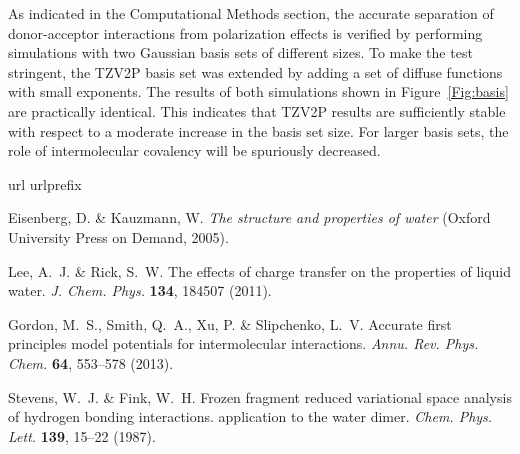 \documentclass[10pt,amsmath,twocolumn,aps,prl,superscriptaddress,floatfix]{revtex4-1}
\begin{document}
As indicated in the Computational Methods section, the accurate separation of donor-acceptor interactions from polarization effects is verified by performing simulations with two Gaussian basis sets of different sizes. 
To make the test stringent, the TZV2P basis set was extended by adding a set of diffuse functions with small exponents. 
The results of both simulations shown in Figure~\ref{Fig:basis} are practically identical. 
This indicates that TZV2P results are sufficiently stable with respect to a moderate increase in the basis set size. 
For larger basis sets, the role of intermolecular covalency will be spuriously decreased.


\fi %

\begin{thebibliography}{10}
\expandafter\ifx\csname url\endcsname\relax
  \def\url#1{\texttt{#1}}\fi
\expandafter\ifx\csname urlprefix\endcsname\relax\def\urlprefix{URL }\fi
\providecommand{\bibinfo}[2]{#2}
\providecommand{\eprint}[2][]{\url{#2}}

\bibinfo{author}{Eisenberg, D.} \& \bibinfo{author}{Kauzmann, W.}
\newblock \emph{\bibinfo{title}{The structure and properties of water}}
  (\bibinfo{publisher}{Oxford University Press on Demand},
  \bibinfo{year}{2005}).

\bibinfo{author}{Lee, A.~J.} \& \bibinfo{author}{Rick, S.~W.}
\newblock \bibinfo{title}{The effects of charge transfer on the properties of
  liquid water}.
\newblock \emph{\bibinfo{journal}{J. Chem. Phys.}}
  \textbf{\bibinfo{volume}{134}}, \bibinfo{pages}{184507}
  (\bibinfo{year}{2011}).

\bibinfo{author}{Gordon, M.~S.}, \bibinfo{author}{Smith, Q.~A.},
  \bibinfo{author}{Xu, P.} \& \bibinfo{author}{Slipchenko, L.~V.}
\newblock \bibinfo{title}{Accurate first principles model potentials for
  intermolecular interactions}.
\newblock \emph{\bibinfo{journal}{Annu. Rev. Phys. Chem.}}
  \textbf{\bibinfo{volume}{64}}, \bibinfo{pages}{553--578}
  (\bibinfo{year}{2013}).

\bibinfo{author}{Stevens, W.~J.} \& \bibinfo{author}{Fink, W.~H.}
\newblock \bibinfo{title}{Frozen fragment reduced variational space analysis of
  hydrogen bonding interactions. application to the water dimer}.
\newblock \emph{\bibinfo{journal}{Chem. Phys. Lett.}}
  \textbf{\bibinfo{volume}{139}}, \bibinfo{pages}{15--22}
  (\bibinfo{year}{1987}).


\end{thebibliography}
\end{document}
